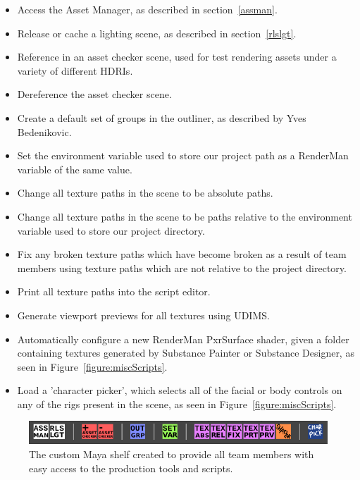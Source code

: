 \documentclass[11pt]{article}
\begin{document}
\begin{itemize}

\item Access the Asset Manager, as described in section~\ref{assman}.

\item Release or cache a lighting scene, as described in section~\ref{rlslgt}.

\item Reference in an asset checker scene, used for test rendering assets under a variety of different HDRIs.

\item Dereference the asset checker scene.

\item Create a default set of groups in the outliner, as described by Yves Bedenikovic.

\item Set the environment variable used to store our project path as a RenderMan variable of the same value.

\item Change all texture paths in the scene to be absolute paths.

\item Change all texture paths in the scene to be paths relative to the environment variable used to store our project directory.

\item Fix any broken texture paths which have become broken as a result of team members using texture paths which are not relative to the project directory.

\item Print all texture paths into the script editor.

\item Generate viewport previews for all textures using UDIMS.

\item Automatically configure a new RenderMan PxrSurface shader, given a folder containing textures generated by Substance Painter or Substance Designer, as seen in Figure~\ref{figure:miscScripts}.

\item Load a 'character picker', which selects all of the facial or body controls on any of the rigs present in the scene, as seen in Figure~\ref{figure:miscScripts}.

\end{itemize}

\begin{figure}[htbp]
\centering
\includegraphics[width=1.0\linewidth]{images/shelf.png}
\caption{\label{figure:shelf} The custom Maya shelf created to provide all team members with easy access to the production tools and scripts.}
\end{figure}
\end{document}
